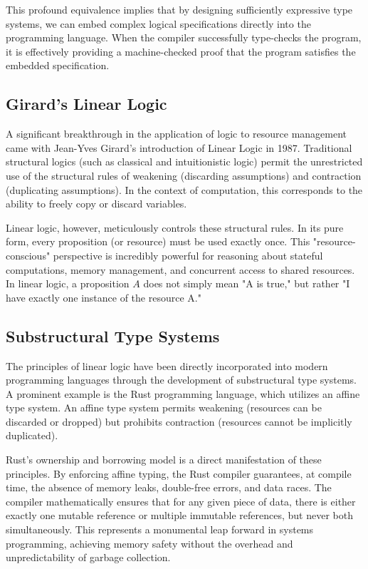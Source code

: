This profound equivalence implies that by designing sufficiently expressive type systems, we can embed complex logical specifications directly into the programming language. When the compiler successfully type-checks the program, it is effectively providing a machine-checked proof that the program satisfies the embedded specification.

\subsection{Girard's Linear Logic}

A significant breakthrough in the application of logic to resource management came with Jean-Yves Girard's introduction of Linear Logic in 1987. Traditional structural logics (such as classical and intuitionistic logic) permit the unrestricted use of the structural rules of weakening (discarding assumptions) and contraction (duplicating assumptions). In the context of computation, this corresponds to the ability to freely copy or discard variables.

Linear logic, however, meticulously controls these structural rules. In its pure form, every proposition (or resource) must be used exactly once. This "resource-conscious" perspective is incredibly powerful for reasoning about stateful computations, memory management, and concurrent access to shared resources. In linear logic, a proposition $A$ does not simply mean "A is true," but rather "I have exactly one instance of the resource A."

\subsection{Substructural Type Systems}

The principles of linear logic have been directly incorporated into modern programming languages through the development of substructural type systems. A prominent example is the Rust programming language, which utilizes an affine type system. An affine type system permits weakening (resources can be discarded or dropped) but prohibits contraction (resources cannot be implicitly duplicated).

Rust's ownership and borrowing model is a direct manifestation of these principles. By enforcing affine typing, the Rust compiler guarantees, at compile time, the absence of memory leaks, double-free errors, and data races. The compiler mathematically ensures that for any given piece of data, there is either exactly one mutable reference or multiple immutable references, but never both simultaneously. This represents a monumental leap forward in systems programming, achieving memory safety without the overhead and unpredictability of garbage collection.

